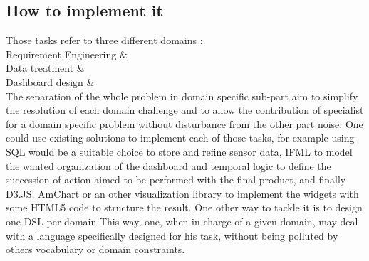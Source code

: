 \subsection{How to implement it}
Those tasks refer to three different domains :\\
Requirement Engineering  \& \\
Data treatment  \& \\
Dashboard design  \& \\
The separation of the whole problem in domain specific sub-part aim to
simplify the resolution of each domain challenge and to allow the
contribution of specialist for a domain specific problem without
disturbance from the other part noise.
One could use existing solutions to implement each of those tasks, for
example using SQL would be a suitable choice to store and refine
sensor data, IFML to model the wanted organization of the dashboard
and temporal logic to define the succession of action aimed to be
performed with the final product, and finally D3.JS, AmChart or an
other visualization library to implement the widgets with some HTML5
code to structure the result.
One other way to tackle it is to design one DSL per domain This way,
one, when in charge of a given domain, may deal with a language
specifically designed for his task, without being polluted by others
vocabulary or domain constraints.